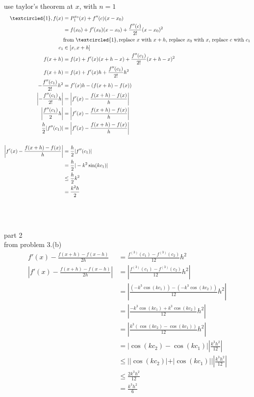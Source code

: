 \documentclass[12pt, border = 4pt, multi]{article} %
\begin{document}
use taylor's theorem at $x$, with $n = 1$\\
\begin{align*}
\textcircled{1}, f(x) &= P_1 ^ {x_0}(x) + f''(c)(x - x_0)\\
&= f(x_0) + f'(x_0)(x - x_0) + \frac{f''(c)}{2!}(x - x_0) ^ 2\\
&\text{from }\textcircled{1}, \text{replace $x$ with $x + h$, replace $x_0$ with $x$, replace $c$ with $c_1$}\\
c_1 &\in [x, x + h]\\
f(x + h) &= f(x) + f'(x)(x + h - x) + \frac{f''(c_1)}{2!}(x + h - x) ^ 2\\
f(x + h) &= f(x) + f'(x)h + \frac{f''(c_1)}{2!}h ^ 2\\
-\frac{f''(c_1)}{2!}h ^ 2 &= f'(x)h - (f(x + h) - f(x))\\
\left|-\frac{f''(c_1)}{2!}h\right| &= \left|f'(x) - \frac{f(x + h) - f(x)}{h}\right|\\
\left|\frac{f''(c_1)}{2}h\right| &= \left|f'(x) - \frac{f(x + h) - f(x)}{h}\right|\\
\frac{h}{2}|f''(c_1)| &= \left|f'(x) - \frac{f(x + h) - f(x)}{h}\right|\\
\\
\left|f'(x) - \frac{f(x + h) - f(x)}{h}\right| &= \frac{h}{2}|f''(c_1)|\\
&= \frac{h}{2}|-k ^ 2\sin(kc_1)|\\
&\leq\frac{h}{2} k ^ 2\\
&= \frac{k ^ 2 h}{2}\\
\end{align*}
\\
\\
\\
part 2\\
from problem 3.(b)
\begin{align*}
f'(x) - \frac{f(x + h) - f(x - h)}{2h} &= \frac{f ^ {(3)}(c_1) - f ^ {(3)}(c_2)}{12}h ^ 2\\
\left|f'(x) - \frac{f(x + h) - f(x - h)}{2h}\right| &= \left|\frac{f ^ {(3)}(c_1) - f ^ {(3)}(c_2)}{12}h ^ 2\right|\\
&= \left|\frac{(-k ^ 3\cos(kc_1)) - (-k ^ 3\cos(kc_2))}{12}h ^ 2\right|\\
&= \left|\frac{-k ^ 3\cos(kc_1) + k ^ 3\cos(kc_2)}{12}h ^ 2\right|\\
&= \left|\frac{k ^ 3(\cos(kc_2) - \cos(kc_1))}{12}h ^ 2\right|\\
&= |\cos(kc_2) - \cos(kc_1)|\left|\frac{k ^ 3 h ^ 2}{12}\right|\\
&\leq ||\cos(kc_2)| + |\cos(kc_1)||\left|\frac{k ^ 3 h ^ 2}{12}\right|\\
&\leq \frac{2 k ^ 3 h ^ 2}{12}\\
&= \frac{k ^ 3 h ^ 2}{6}\\
\end{align*}
\end{document}
